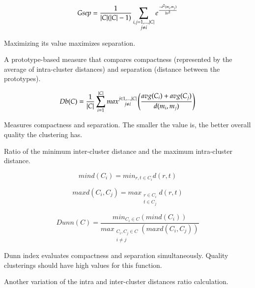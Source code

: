\begin{equation} 
Gsep=\frac{1}{\lvert C\rvert(\lvert C\rvert-1)}\sum_{\substack{i,j = 1,\dotsc,\lvert C\rvert \\ j \neq i}} e^{\frac{-d^2(m_i,m_j)}{2\sigma^2}}
\end{equation} 

Maximizing its value maximizes separation.



A prototype-based measure that compares compactness (represented by
the average of intra-cluster distances) and separation (distance between
the prototypes).

\begin{equation} 
Db(C)=\frac{1}{\lvert C\rvert}\sum_{i=1}^{\lvert C\rvert}max\substack{j \in 1,\dotsc,\lvert C\rvert \\ j \neq i} \left(\frac{avg(C_i)+avg(C_j)}{d(m_i,m_j)}\right)
\end{equation} 

Measures compactness and separation. The smaller the value is, the better
overall quality the clustering has.



Ratio of the minimum inter-cluster distance and the maximum intra-cluster
distance.

\begin{equation}
mind(C_i)=min_{r,t\in C_i} d(r,t)
\end{equation}

\begin{equation}
maxd(C_i,C_j)=max_{\substack{ r \in C_i \\ t \in C_j}} d(r,t)
\end{equation}

\begin{equation}
Dunn(C)=\frac{min_{C_i \in C}(mind(C_i))}{max_{\substack{C_i,C_j \in C\\i \neq j}} (maxd(C_i,C_j))}
\end{equation}

Dunn index evaluates compactness and separation simultaneously. Quality
clusterings should have high values for this function.



Another variation of the intra and inter-cluster distances ratio
calculation.

